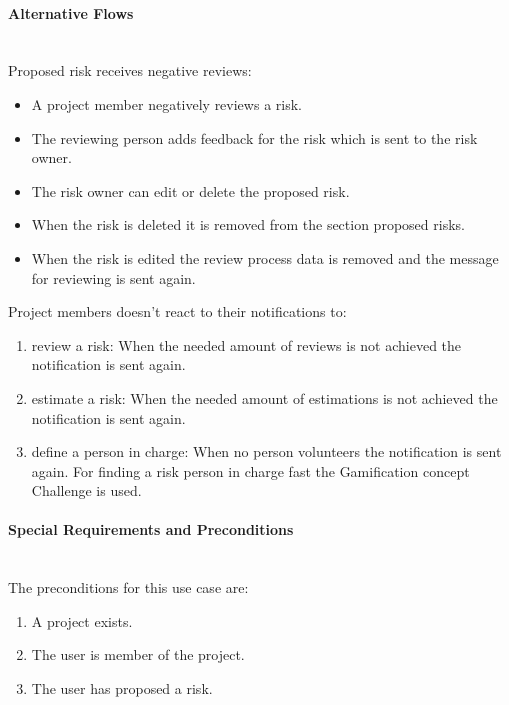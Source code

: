 \newpage

\paragraph*{Alternative Flows}\mbox{}\\

\noindent
Proposed risk receives negative reviews:
\begin{itemize}
	\vspace{-3mm}
	\setlength\itemsep{-1em}
	
	\item A project member negatively reviews a risk.
	\item The reviewing person adds feedback for the risk which is sent to the risk owner.
	\item The risk owner can edit or delete the proposed risk.
	\item When the risk is deleted it is removed from the section proposed risks.
	\item When the risk is edited the review process data is removed and the message for reviewing is sent again.
\end{itemize}

\noindent
Project members doesn't react to their notifications to:
\begin{enumerate}
	\vspace{-3mm}
	\setlength\itemsep{-1em}
	
	\item review a risk: When the needed amount of reviews is not achieved the notification is sent again.
	\item estimate a risk: When the needed amount of estimations is not achieved the notification is sent again.
	\item define a person in charge: When no person volunteers the notification is sent again. For finding a risk person in charge fast the Gamification concept Challenge is used.
\end{enumerate}

\paragraph*{Special Requirements and Preconditions}\mbox{}\\
The preconditions for this use case are:
\begin{enumerate}
	\vspace{-3mm}
	\setlength\itemsep{-1em}
	
	\item  A project exists.
	\item The user is member of the project.
	\item The user has proposed a risk.
\end{enumerate}

